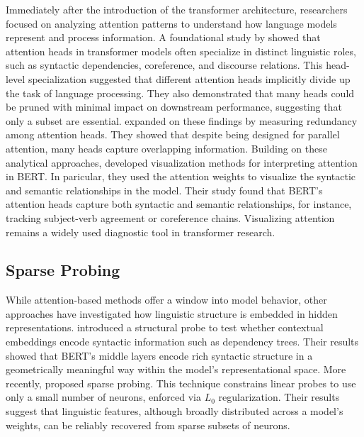 Immediately after the introduction of the transformer architecture, researchers focused on analyzing attention patterns to understand how language models represent and process information. A foundational study by \citet{voita2019analyzing} showed that attention heads in transformer models often specialize in distinct linguistic roles, such as syntactic dependencies, coreference, and discourse relations. This head-level specialization suggested that different attention heads implicitly divide up the task of language processing. They also demonstrated that many heads could be pruned with minimal impact on downstream performance, suggesting that only a subset are essential. \citet{michel2019sixteen} expanded on these findings by measuring redundancy among attention heads. They showed that despite being designed for parallel attention, many heads capture overlapping information. Building on these analytical approaches, \citet{clark2019does} developed visualization methods for interpreting attention in BERT. In paricular, they used the attention weights to visualize the syntactic and semantic relationships in the model. Their study found that BERT's attention heads capture both syntactic and semantic relationships, for instance, tracking subject-verb agreement or coreference chains. Visualizing attention remains a widely used diagnostic tool in transformer research. 

\subsection{Sparse Probing}

While attention-based methods offer a window into model behavior, other approaches have investigated how linguistic structure is embedded in hidden representations. \citet{hewitt2019structural} introduced a structural probe to test whether contextual embeddings encode syntactic information such as dependency trees. Their results showed that BERT's middle layers encode rich syntactic structure in a geometrically meaningful way within the model's representational space. More recently, \citet{gurnee2023finding} proposed sparse probing. This technique constrains linear probes to use only a small number of neurons, enforced via $L_0$ regularization. Their results suggest that linguistic features, although broadly distributed across a model's weights, can be reliably recovered from sparse subsets of neurons. %

